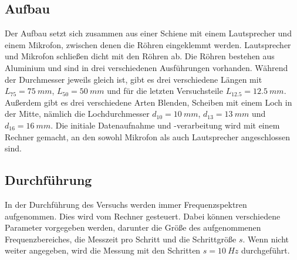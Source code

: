 %
\subsection{Aufbau}
Der Aufbau setzt sich zusammen aus einer Schiene mit einem Lautsprecher und einem Mikrofon, zwischen denen die Röhren eingeklemmt werden.
Lautsprecher und Mikrofon schließen dicht mit den Röhren ab.
Die Röhren bestehen aus Aluminium und sind in drei verschiedenen Ausführungen vorhanden.
Während der Durchmesser jeweils gleich ist, gibt es drei verschiedene Längen mit $L_{75} = \SI{75}{mm}$, $L_{50} = \SI{50}{mm}$ und für die letzten Versuchsteile $L_{12.5} = \SI{12.5}{mm}$.
Außerdem gibt es drei verschiedene Arten Blenden, Scheiben mit einem Loch in der Mitte, nämlich die Lochdurchmesser $d_{10} = \SI{10}{mm}$, $d_{13} = \SI{13}{mm}$ und $d_{16} = \SI{16}{mm}$.
Die initiale Datenaufnahme und -verarbeitung wird mit einem Rechner gemacht, an den sowohl Mikrofon als auch Lautsprecher angeschlossen sind.\\
%
\subsection{Durchführung}
In der Durchführung des Versuchs werden immer Frequenzspektren aufgenommen.
Dies wird vom Rechner gesteuert.
Dabei können verschiedene Parameter vorgegeben werden, darunter die Größe des aufgenommenen Frequenzbereiches, die Messzeit pro Schritt und die Schrittgröße $s$.
Wenn nicht weiter angegeben, wird die Messung mit den Schritten $s = \SI{10}{Hz}$ durchgeführt.\\
%
%
